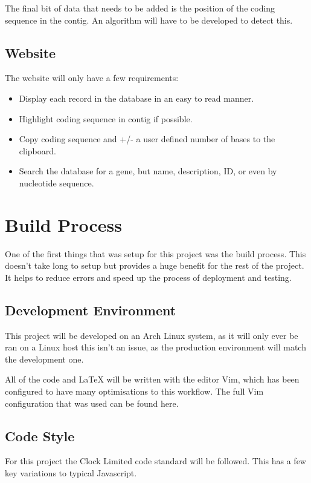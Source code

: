 The final bit of data that needs to be added is the position of the coding sequence in the contig. An algorithm will have to be developed to detect this.

\subsection{Website}
The website will only have a few requirements: 

\begin{itemize}
  \item Display each record in the database in an easy to read manner. 
  \item Highlight coding sequence in contig if possible.
  \item Copy coding sequence and +/- a user defined number of bases to the clipboard.
  \item Search the database for a gene, but name, description, ID, or even by nucleotide sequence. 
\end{itemize}

\section{Build Process}
  One of the first things that was setup for this project was the build process. This doesn't take long to setup but provides a huge benefit for the rest of the project. It helps to reduce errors and speed up the process of deployment and testing.

  \subsection{Development Environment}
    This project will be developed on an Arch Linux system, as it will only ever be ran on a Linux host this isn't an issue, as the production environment will match the development one. 

    All of the code and LaTeX will be written with the editor Vim, which has been configured to have many optimisations to this workflow. The full Vim configuration that was used can be found here\cite{vimrc}.

  \subsection{Code Style}
  For this project the Clock Limited code standard\cite{clockstandard} will be followed. This has a few key variations to typical Javascript. 

